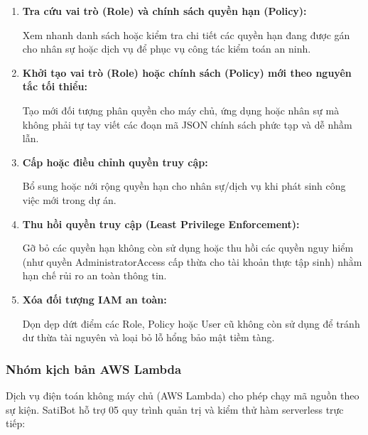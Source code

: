 \documentclass[a4paper,12pt]{article}
\begin{document}
\begin{enumerate}
  \item \textbf{Tra cứu vai trò (Role) và chính sách quyền hạn (Policy):}

Xem nhanh danh sách hoặc kiểm tra chi tiết các quyền hạn đang được gán cho nhân sự hoặc dịch vụ để phục vụ công tác kiểm toán an ninh.


  \item \textbf{Khởi tạo vai trò (Role) hoặc chính sách (Policy) mới theo nguyên tắc tối thiểu:}

Tạo mới đối tượng phân quyền cho máy chủ, ứng dụng hoặc nhân sự mà không phải tự tay viết các đoạn mã JSON chính sách phức tạp và dễ nhầm lẫn.


  \item \textbf{Cấp hoặc điều chỉnh quyền truy cập:}

Bổ sung hoặc nới rộng quyền hạn cho nhân sự/dịch vụ khi phát sinh công việc mới trong dự án.


  \item \textbf{Thu hồi quyền truy cập (Least Privilege Enforcement):}

Gỡ bỏ các quyền hạn không còn sử dụng hoặc thu hồi các quyền nguy hiểm (như quyền AdministratorAccess cấp thừa cho tài khoản thực tập sinh) nhằm hạn chế rủi ro an toàn thông tin.


  \item \textbf{Xóa đối tượng IAM an toàn:}

Dọn dẹp dứt điểm các Role, Policy hoặc User cũ không còn sử dụng để tránh dư thừa tài nguyên và loại bỏ lỗ hổng bảo mật tiềm tàng.

\end{enumerate}

\subsubsection{Nhóm kịch bản AWS Lambda}

Dịch vụ điện toán không máy chủ (AWS Lambda) cho phép chạy mã nguồn theo sự kiện. SatiBot hỗ trợ 05 quy trình quản trị và kiểm thử hàm serverless trực tiếp:
\end{document}
